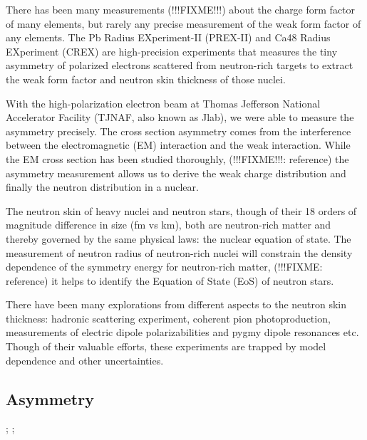 There has been many measurements (!!!FIXME!!!) about the charge form factor of many elements,
but rarely any precise measurement of the weak form factor of any elements.
The Pb Radius EXperiment-II (PREX-II) and Ca48 Radius EXperiment (CREX) are 
high-precision experiments that measures the tiny asymmetry of polarized electrons
scattered from neutron-rich targets to extract the weak form factor and neutron
skin thickness of those nuclei. 


With the high-polarization electron beam at 
Thomas Jefferson National Accelerator Facility (TJNAF, also known as Jlab), 
we were able to measure the asymmetry precisely. 
The cross section asymmetry comes from the interference between 
the electromagnetic (EM) interaction and the weak interaction. While the EM 
cross section has been studied thoroughly, (!!!FIXME!!!: reference) the asymmetry 
measurement allows us to derive the weak charge distribution and finally the
neutron distribution in a nuclear.

The neutron skin of heavy nuclei and neutron stars, though of their 18 orders of 
magnitude difference in size (fm vs km), both are neutron-rich matter and thereby
governed by the same physical laws: the nuclear equation of state. 
The measurement of neutron radius of neutron-rich nuclei will constrain 
the density dependence of the symmetry energy for neutron-rich matter,
(!!!FIXME: reference)
it helps to identify the Equation of State (EoS) of neutron stars.

There have been many explorations from different aspects to the neutron skin
thickness: hadronic scattering experiment, coherent pion photoproduction,
measurements of electric dipole polarizabilities and pygmy dipole resonances etc.
Though of their valuable efforts, these experiments are trapped by model 
dependence and other uncertainties.


\subsection{Asymmetry}
;
;

